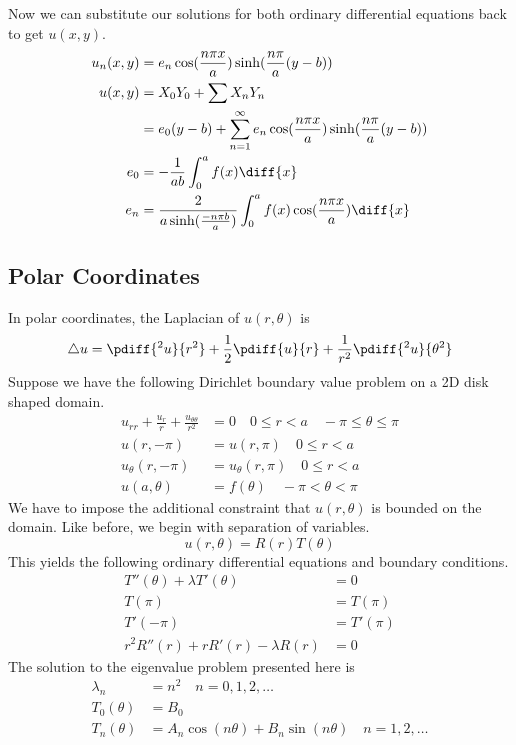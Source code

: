 \documentclass{math}
\begin{document}
Now we can substitute our solutions for both ordinary differential equations
back to get \( u(x,y) \).
\begin{align*}
  u_n(x,y) &= e_n\cos(\frac{n\pi x}{a})\sinh(\frac{n\pi}{a}(y-b)) \\
  u(x,y) &= X_0Y_0+\sum X_nY_n \\
  &= e_0(y-b)+\sum_{n=1}^{\infty}e_n\cos(\frac{n\pi x}{a})
    \sinh(\frac{n\pi}{a}(y-b)) \\
  e_0 &= -\frac{1}{ab}\int_{0}^{a}f(x)\diff{x} \\
  e_n &= \frac{2}{a\sinh(\frac{-n\pi b}{a})}
    \int_{0}^{a}f(x)\cos(\frac{n\pi x}{a})\diff{x}
\end{align*}

\subsection*{Polar Coordinates}
In polar coordinates, the Laplacian of \( u(r,\theta) \) is
\[ \triangle u =
  \pdiff{^2u}{r^2}+\frac{1}{2}\pdiff{u}{r}+\frac{1}{r^2}\pdiff{^2u}{\theta^2} \]
Suppose we have the following Dirichlet boundary value problem on a 2D disk
shaped domain.
\begin{align*}
  u_{rr}+\frac{u_r}{r}+\frac{u_{\theta\theta}}{r^2} &= 0 \quad 0\le r<a \quad
    -\pi\le\theta\le\pi \\
  u(r,-\pi) &= u(r,\pi) \quad 0\le r<a \\
  u_{\theta}(r,-\pi) &= u_{\theta}(r,\pi) \quad 0\le r<a \\
  u(a,\theta) &= f(\theta) \quad -\pi<\theta<\pi
\end{align*}
We have to impose the additional constraint that \( u(r,\theta) \) is bounded
on the domain. Like before, we begin with separation of variables.
\[ u(r,\theta) = R(r)T(\theta) \]
This yields the following ordinary differential equations and boundary
conditions.
\begin{align*}
  T''(\theta)+\lambda T'(\theta) &= 0 \\
  T(\pi) &= T(\pi) \\
  T'(-\pi) &= T'(\pi) \\
  r^2R''(r)+rR'(r)-\lambda R(r) &= 0
\end{align*}
The solution to the eigenvalue problem presented here is
\begin{align*}
  \lambda_n &= n^2 \quad n = 0,1,2,\dots \\
  T_0(\theta) &= B_0 \\
  T_n(\theta) &= A_n\cos(n\theta)+B_n\sin(n\theta) \quad n = 1,2,\dots
\end{align*}
\end{document}
